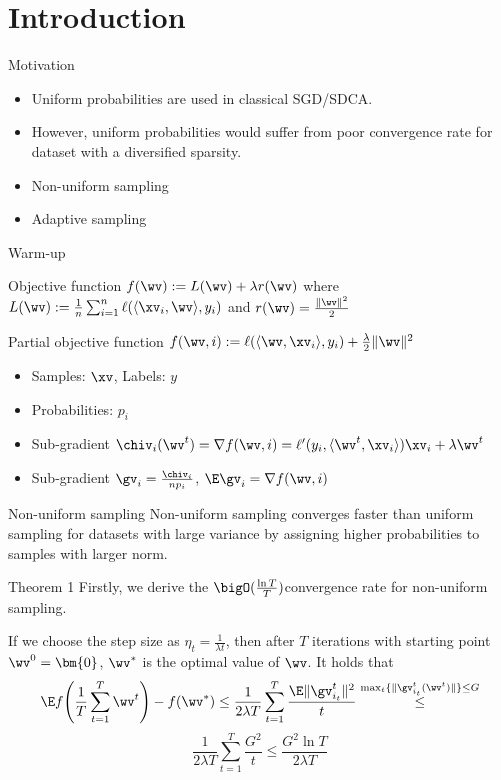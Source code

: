 \section{Introduction}

\begin{frame}{Motivation}
    \begin{itemize}
        \item Uniform probabilities are used in classical SGD/SDCA. 
        \item However, uniform probabilities would suffer from poor convergence rate for dataset with a diversified sparsity.
        \item Non-uniform sampling
        \item Adaptive sampling
    \end{itemize}
\end{frame}

\begin{frame}{Warm-up}
\begin{block}{Objective function}
    $f(\wv):= L(\wv)+\lambda r(\wv)$ where 
    $L(\wv) := \frac1n \sum_{i=1}^n \ell(\langle \xv_i, \wv \rangle, y_i)$
    and 
    $r(\wv) = \frac{\|\wv\|^2}{2}$
\end{block}
\begin{block}{Partial objective function}
    $f(\wv, i):= \ell(\langle \wv, \xv_i\rangle, y_i)+\frac {\lambda} {2} \|\wv\|^2$
\end{block}
\begin{itemize}
    \item Samples: $\xv$, Labels: $y$
    \item Probabilities: $p_i$
    \item Sub-gradient $\chiv_{i}(\wv^{t}) = \nabla f(\wv, i) = \ell'(y_{i}, \langle \wv^{t}, \xv_{i}\rangle)\xv_{i}+\lambda\wv^{t}$
    \item Sub-gradient $\gv_i = \frac{\chiv_{i}}{np_i}$, $\E\gv_i = \nabla f(\wv, i)$
\end{itemize}
\end{frame}

\begin{frame}{Non-uniform sampling}
Non-uniform sampling converges faster than uniform sampling for datasets with large variance by assigning higher probabilities to samples with larger norm.
\end{frame}

\begin{frame}{Theorem 1}
Firstly, we derive the $\bigO(\frac{\ln T}{T})$convergence rate for non-uniform sampling.

If we choose the step size as $\eta_t = \frac{1}{\lambda t}$, then after $T$ iterations with starting point $\wv^{0}=\bm{0}$, $\wv^*$ is the optimal value of $\wv$. It holds that
\[
    \E f\!\left(\frac1T\sum_{t=1}^T \wv^{t} \right)- f(\wv^*) \le \frac{1}{2\lambda T}\sum_{t=1}^T \frac{\E\|\gv_{i_t}^{t}\|^2}{t} 
    \overset{ \max_{t}\{\|\gv_{i_t}^t(\wv^t)\|\} \le G}{\le}
    \]
    \[
    \frac{1}{2\lambda T} \sum_{t=1}^T \frac{G^2}{t} \le \frac{G^2\ln T}{2\lambda T} 
\]
\end{frame}


